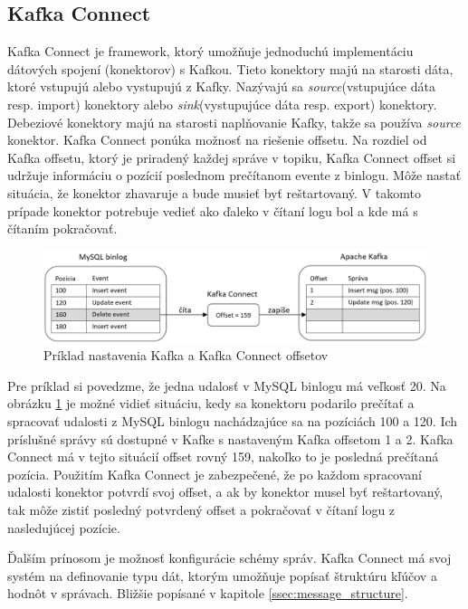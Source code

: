 \subsection{Kafka Connect}\label{kafka_connect}
Kafka Connect je framework, ktorý umožňuje jednoduchú implementáciu dátových spojení (konektorov) s Kafkou. Tieto konektory majú na starosti dáta, ktoré vstupujú alebo vystupujú z Kafky. Nazývajú sa \textit{source}(vstupujúce dáta resp. import) konektory alebo \textit{sink}(vystupujúce dáta resp. export) konektory. Debeziové konektory majú na starosti naplňovanie Kafky, takže sa používa \textit{source} konektor. Kafka Connect ponúka možnosť na riešenie offsetu. Na rozdiel od Kafka offsetu, ktorý je priradený každej správe v topiku, Kafka Connect offset si udržuje informáciu o pozícií poslednom prečítanom evente z binlogu. Môže nastať situácia, že konektor zhavaruje a bude musieť byť reštartovaný. V takomto prípade konektor potrebuje vedieť ako ďaleko v čítaní logu bol a kde má s čítaním pokračovať. 

\begin{figure}[H]
\begin{center}
\includegraphics[width=15cm]{figures/kafka_offsets.PNG}
\caption{Príklad nastavenia Kafka a Kafka Connect offsetov}
\label{fig:kafka_offsets}
\end{center}
\end{figure}

Pre príklad si povedzme, že jedna udalosť v MySQL binlogu má veľkosť 20. Na obrázku \ref{fig:kafka_offsets} je možné vidieť situáciu, kedy sa konektoru podarilo prečítať a spracovať udalosti z MySQL binlogu nachádzajúce sa na pozíciách 100 a 120. Ich príslušné správy sú dostupné v Kafke s nastaveným Kafka offsetom 1 a 2. Kafka Connect má v tejto situácií offset rovný 159, nakoľko to je posledná prečítaná pozícia. Použitím Kafka Connect je zabezpečené, že po každom spracovaní udalosti konektor potvrdí svoj offset, a ak by konektor musel byť reštartovaný, tak môže zistiť posledný potvrdený offset a pokračovať v čítaní logu z nasledujúcej pozície.

Ďalším prínosom je možnosť konfigurácie schémy správ. Kafka Connect má svoj systém na definovanie typu dát, ktorým umožňuje popísať štruktúru kľúčov a hodnôt v správach. Bližšie popísané v kapitole \ref{ssec:message_structure}.

